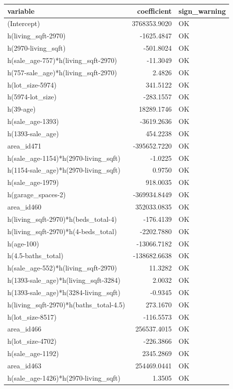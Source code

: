 \documentclass[
]{article}
\begin{document}
{\def\LTcaptype{} %
\begin{longtable}[]{@{}lrl@{}}
\toprule\noalign{}
variable & coefficient & sign\_warning \\
\midrule\noalign{}
\endhead
\bottomrule\noalign{}
\endlastfoot
(Intercept) & 3768353.9020 & OK \\
h(living\_sqft-2970) & -1625.4847 & OK \\
h(2970-living\_sqft) & -501.8024 & OK \\
h(sale\_age-757)*h(living\_sqft-2970) & -11.3049 & OK \\
h(757-sale\_age)*h(living\_sqft-2970) & 2.4826 & OK \\
h(lot\_size-5974) & 341.5122 & OK \\
h(5974-lot\_size) & -283.1557 & OK \\
h(39-age) & 18289.1746 & OK \\
h(sale\_age-1393) & -3619.2636 & OK \\
h(1393-sale\_age) & 454.2238 & OK \\
area\_id471 & -395652.7220 & OK \\
h(sale\_age-1154)*h(2970-living\_sqft) & -1.0225 & OK \\
h(1154-sale\_age)*h(2970-living\_sqft) & 0.9750 & OK \\
h(sale\_age-1979) & 918.0035 & OK \\
h(garage\_spaces-2) & -369934.8449 & OK \\
area\_id460 & 352033.0835 & OK \\
h(living\_sqft-2970)*h(beds\_total-4) & -176.4139 & OK \\
h(living\_sqft-2970)*h(4-beds\_total) & -2202.7880 & OK \\
h(age-100) & -13066.7182 & OK \\
h(4.5-baths\_total) & -138682.6638 & OK \\
h(sale\_age-552)*h(living\_sqft-2970) & 11.3282 & OK \\
h(1393-sale\_age)*h(living\_sqft-3284) & 2.0032 & OK \\
h(1393-sale\_age)*h(3284-living\_sqft) & -0.9345 & OK \\
h(living\_sqft-2970)*h(baths\_total-4.5) & 273.1670 & OK \\
h(lot\_size-8517) & -116.5573 & OK \\
area\_id466 & 256537.4015 & OK \\
h(lot\_size-4702) & -226.3866 & OK \\
h(sale\_age-1192) & 2345.2869 & OK \\
area\_id463 & 254469.0441 & OK \\
h(sale\_age-1426)*h(2970-living\_sqft) & 1.3505 & OK \\
\end{longtable}
}
\end{document}
